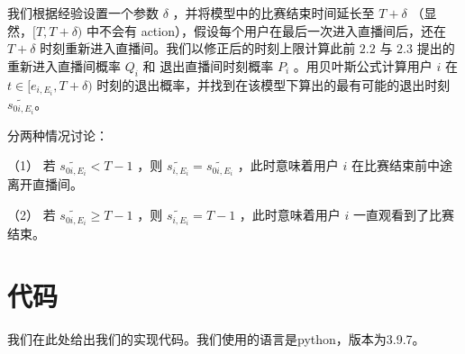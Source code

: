\documentclass{article} %
\begin{document}
我们根据经验设置一个参数 $\delta$ ，并将模型中的比赛结束时间延长至 $T+\delta$ （显然，$[T,T+\delta)$ 中不会有 action），假设每个用户在最后一次进入直播间后，还在 $T+\delta$ 时刻重新进入直播间。我们以修正后的时刻上限计算此前 $2.2$ 与 $2.3$ 提出的重新进入直播间概率 $Q_i$ 和 退出直播间时刻概率 $P_i$ 。用贝叶斯公式计算用户 $i$ 在 $t\in [e_{i,E_i},T+\delta)$ 时刻的退出概率，并找到在该模型下算出的最有可能的退出时刻 $\widetilde{s_{0i,E_i}}$。

分两种情况讨论：

（1） 若 $\widetilde{s_{0i,E_i}} < T-1$ ，则 $\widetilde{s_{i,E_i}}=\widetilde{s_{0i,E_i}}$ ，此时意味着用户 $i$ 在比赛结束前中途离开直播间。

（2） 若 $\widetilde{s_{0i,E_i}} \geq T-1$ ，则 $\widetilde{s_{i,E_i}}=T-1$ ，此时意味着用户 $i$ 一直观看到了比赛结束。

\appendix
\section{代码}

我们在此处给出我们的实现代码。我们使用的语言是python，版本为3.9.7。
\end{document}
